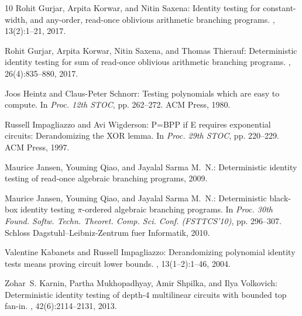 \begin{thebibliography}{10}
{\sc Rohit Gurjar, Arpita Korwar, and Nitin Saxena}: Identity testing for
  constant-width, and any-order, read-once oblivious arithmetic branching
  programs.
, 13(2):1--21, 2017.

{\sc Rohit Gurjar, Arpita Korwar, Nitin Saxena, and Thomas Thierauf}:
  Deterministic identity testing for sum of read-once oblivious arithmetic
  branching programs.
, 26(4):835--880, 2017.
\newblock [\epfmtdoi{10.1007/s00037-016-0141-z}]

{\sc Joos Heintz and Claus-Peter Schnorr}: Testing polynomials which are easy
  to compute.
\newblock In {\em Proc. 12th STOC}, pp. 262--272. ACM Press, 1980.
\newblock [\epfmtdoi{10.1145/800141.804674}]

{\sc Russell Impagliazzo and Avi Wigderson}: {P=BPP} if {E} requires
  exponential circuits: Derandomizing the {XOR} lemma.
\newblock In {\em Proc. 29th STOC}, pp. 220--229. ACM Press, 1997.
\newblock [\epfmtdoi{10.1145/258533.258590}]

{\sc Maurice Jansen, Youming Qiao, and Jayalal Sarma M.~N.}: Deterministic
  identity testing of read-once algebraic branching programs, 2009.

{\sc Maurice Jansen, Youming Qiao, and Jayalal Sarma M.~N.}: Deterministic
  black-box identity testing {$\pi$}-ordered algebraic branching programs.
\newblock In {\em Proc. 30th Found. Softw. Techn. Theoret. Comp. Sci. Conf.
  (FSTTCS'10)}, pp. 296--307. Schloss Dagstuhl--Leibniz-Zentrum fuer
  Informatik, 2010.

{\sc Valentine Kabanets and Russell Impagliazzo}: Derandomizing polynomial
  identity tests means proving circuit lower bounds.
, 13(1--2):1--46, 2004.
\newblock [\epfmtdoi{10.1007/s00037-004-0182-6}]

{\sc Zohar~S. Karnin, Partha Mukhopadhyay, Amir Shpilka, and Ilya Volkovich}:
  Deterministic identity testing of depth-4 multilinear circuits with bounded
  top fan-in.
, 42(6):2114--2131, 2013.
\newblock [\epfmtdoi{10.1137/110824516}]


\end{thebibliography}

